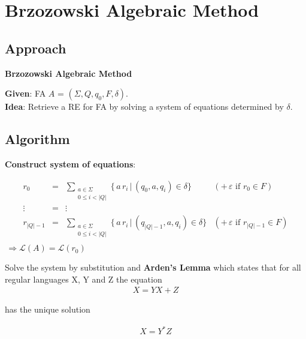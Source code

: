 \documentclass{beamer}
\begin{document}
\section{Brzozowski Algebraic Method}
\subsection*{Approach}
\begin{frame}
    \textbf{Brzozowski Algebraic Method}

    \textbf{Given}: FA $A$ = $(\Sigma, Q, q_0, F, \delta)$.\\
    \textbf{Idea}: Retrieve a RE for FA by solving a system of equations determined by $\delta$.

\end{frame}

\subsection*{Algorithm}
\begin{frame}
    \textbf{Construct system of equations}:

    \begin{equation*}
        \begin{array}{lcll} 
            r_0 & = & 
            \displaystyle\sum\limits_{
                \substack{a \in \Sigma \\ 0 \leq i < |Q|} 
            }
            \{ \, a \, r_i \, |  \, (q_0, a, q_i) \in \delta \} 
            &
            (+ \, \varepsilon \mbox{ if } r_0 \in F)
            \\ 
           \vdots &  = & \vdots \\
        r_{|Q|-1} & = & 
            \displaystyle\sum\limits_{
                \substack{a \in \Sigma \\ 0 \leq i < |Q|} 
            }
            \{ \, a \, r_i \, |  \, (q_{|Q|-1}, a, q_i) \in \delta \} 
            &
            (+ \, \varepsilon \mbox{ if } r_{|Q|-1} \in F)
            \\ 
        \end{array}
    \end{equation*}
    $\, \Rightarrow \mathcal{L}(A) = \mathcal{L}(r_0)$
\end{frame}

\begin{frame}
    Solve the system by substitution and \textbf{Arden's Lemma} which states that for all regular languages X, Y and Z the equation
    \begin{equation}
        \begin{array}{lcl}
            X = YX + Z
        \end{array}
    \end{equation}

    has the unique solution

    \begin{equation}
        \begin{array}{lcl}
            X = Y^*Z
        \end{array}
    \end{equation}
\end{frame}
\end{document}
